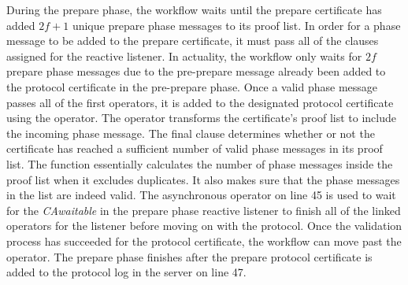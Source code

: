 During the prepare phase, the workflow waits until the prepare certificate has added $2f+1$ unique prepare phase messages to its proof list. In order for a phase message to be added to the prepare certificate, it must pass all of the  clauses assigned for the reactive listener. In actuality, the workflow only waits for $2f$ prepare phase messages due to the pre-prepare message already been added to the protocol certificate in the pre-prepare phase. Once a valid phase message passes all of the first  operators, it is added to the designated protocol certificate using the  operator. The  operator transforms the certificate’s proof list to include the incoming phase message.  The final  clause determines whether or not the certificate has reached a sufficient number of valid phase messages in its proof list.
The  function essentially calculates the number of phase messages inside the proof list when it excludes duplicates. It also makes sure that the phase messages in the list are indeed valid. The asynchronous  operator on line 45 is used to wait for the \emph{CAwaitable} in the prepare phase reactive listener to finish all of the linked operators for the listener before moving on with the protocol. Once the validation process has succeeded for the protocol certificate, the workflow can move past the  operator. The prepare phase finishes after the prepare protocol certificate is added to the protocol log in the server on line 47.

